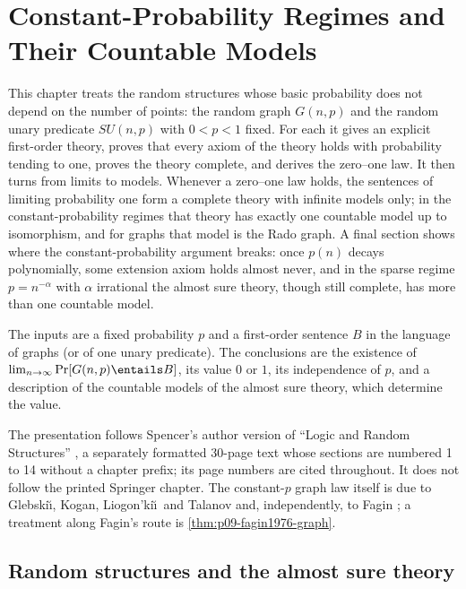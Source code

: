 \chapter{Constant-Probability Regimes and Their Countable Models}
\label{sec:p03-w03-p03-067-constant-p}

This chapter treats the random structures whose basic probability does not
depend on the number of points: the random graph \(G(n,p)\) and the random
unary predicate \(SU(n,p)\) with \(0<p<1\) fixed.  For each it gives an
explicit first-order theory, proves that every axiom of the theory holds with
probability tending to one, proves the theory complete, and derives the
zero--one law.  It then turns from limits to models.  Whenever a zero--one law
holds, the sentences of limiting probability one form a complete theory with
infinite models only; in the constant-probability regimes that theory has
exactly one countable model up to isomorphism, and for graphs that model is
the Rado graph.  A final section shows where the constant-probability argument
breaks: once \(p(n)\) decays polynomially, some extension axiom holds almost
never, and in the sparse regime \(p=n^{-\alpha}\) with \(\alpha\) irrational the
almost sure theory, though still complete, has more than one countable model.

The inputs are a fixed probability \(p\) and a first-order sentence \(B\) in
the language of graphs (or of one unary predicate).  The conclusions are the
existence of \(\lim_{n\to\infty}\Pr[G(n,p)\entails B]\), its value \(0\) or
\(1\), its independence of \(p\), and a description of the countable models
of the almost sure theory, which determine the value.

The presentation follows Spencer's author version of ``Logic and Random
Structures'' \cite{Spencer2007LogicRandomStructuresAuthor}, a separately
formatted 30-page text whose sections are numbered 1 to 14 without a chapter
prefix; its page numbers are cited throughout.  It does not follow the
printed Springer chapter.  The constant-\(p\) graph law itself is due to
Glebski\u\i, Kogan, Liogon'ki\u\i\ and Talanov and, independently, to Fagin
\cite[p.~12]{Spencer2007LogicRandomStructuresAuthor}; a treatment along
Fagin's route is \cref{thm:p09-fagin1976-graph}.

\section{Random structures and the almost sure theory}
\label{sec:p03-w03-p03-067-setting}

